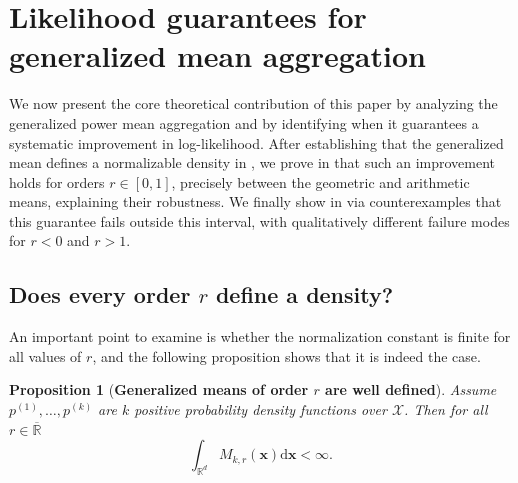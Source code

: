 \documentclass[accepted]{uai2026} %
\newtheorem{proposition}{Proposition}[section]
\newcommand{\R}{\mathbb{R}}
\newcommand{\vx}{\mathbf{x}}
\newcommand{\vd}{\mathrm{d}}
\begin{document}



\section{Likelihood guarantees for generalized mean aggregation}\label{section: aggregation of densities theory}

We now present the core theoretical contribution of this paper by analyzing the generalized power mean aggregation and by identifying when it guarantees a systematic improvement in log-likelihood. After establishing that the generalized mean defines a normalizable density in , we prove in  that such an improvement holds for orders $r \in [0,1]$, precisely between the geometric and arithmetic means, explaining their robustness. We finally show in  via counterexamples that this guarantee fails outside this interval, with qualitatively different failure modes for $r<0$ and $r>1$.

\subsection{Does every order $r$ define a density?}\label{section: does every order r density}
An important point to examine is whether the normalization constant is finite for all values of $r$, and the following proposition shows that it is indeed the case. 
\begin{proposition}[\textbf{Generalized means of order $r$ are well defined}]\label{proposition: generalized p-mean well defined}
Assume $p^{(1)},\dots,p^{(k)}$ are $k$ positive probability density functions over $\mathcal{X}$. Then for all $r \in \overline{\R}$
\begin{equation}
\int_{\R^d} M_{k,r}(\vx) \vd \vx < \infty.
\end{equation}

\end{proposition}
\end{document}
